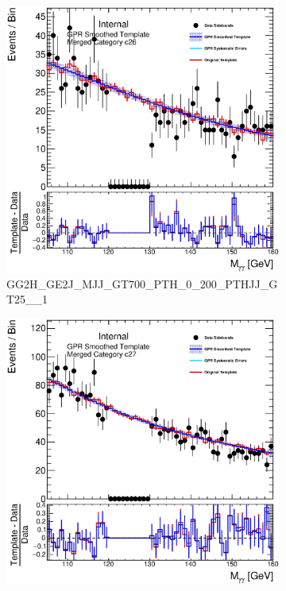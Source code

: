 \begin{figure}
\begin{center}
\begin{subfigure}[T]{0.49\linewidth}
	\centering
	\includegraphics[width=\linewidth]{figures/background/gpr/coupCatTemplates/GPR_Smoothed_Plot_hmgg_c26.eps}
	\caption{\tiny{GG2H\_GE2J\_MJJ\_GT700\_PTH\_0\_200\_PTHJJ\_GT25\_\_1}}
\end{subfigure}
\begin{subfigure}[T]{0.49\linewidth}
	\centering
	\includegraphics[width=\linewidth]{figures/background/gpr/coupCatTemplates/GPR_Smoothed_Plot_hmgg_c27.eps}

\end{subfigure}
\end{center}
\end{figure}
